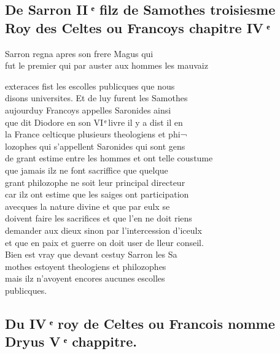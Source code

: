 \documentclass[12pt]{article}
\begin{document}
\subsection*{De Sarron II ͤ filz de Samothes troisiesme\protect\\  Roy des Celtes ou Francoys
          chapitre IV ͤ}


Sarron regna apres son frere Magus qui\\
fut le premier qui par auster aux hommes les
          mauvaiz



\newpage




exteraces fist les escolles publicques que nous\\
disons universites.
          Et de luy furent les Samothes\\
aujourduy Francoys appelles Saronides ainsi\\
que dit Diodore en son VI ͤ livre il y a dist il en\\
la France celticque plusieurs theologiens et phi¬\\
lozophes qui s'appellent
          Saronides qui sont gens\\
de grant estime entre les hommes et ont telle
            coustume\\
que jamais ilz ne font sacriffice que quelque\\
grant
          philozophe ne soit leur principal directeur\\
car ilz ont estime que les saiges
          ont participation\\
avecques la nature divine et que par eulx se\\

          doivent faire les sacrifices et que l'en ne doit riens\\
demander aux dieux sinon
          par l'intercession d'iceulx\\
et que en paix et guerre on doit user de lleur
            conseil.\\
Bien est vray que devant cestuy Sarron les Sa\\
mothes estoyent theologiens et philozophes\\
mais ilz n'avoyent encores aucunes escolles\\
publicques.





\subsection*{Du IV ͤ roy de Celtes ou Francois nomme\protect\\ Dryus V ͤ chappitre.}
\end{document}
